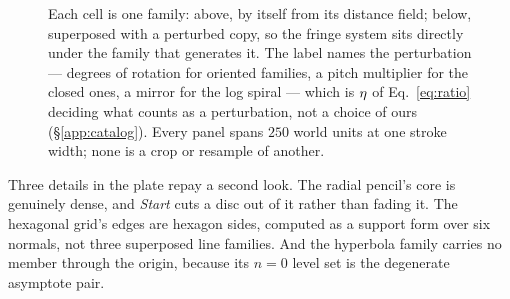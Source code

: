 \begin{figure}[p]
  \centering

  \vskip 7pt

  \vskip 7pt

  \vskip 4pt
  \caption{ Each cell is one
  family: above, by itself from its distance field; below, superposed with a
  perturbed copy, so the fringe system sits directly under the family that
  generates it. The label names the perturbation --- degrees of rotation for
  oriented families, a pitch multiplier for the closed ones, a mirror for the
  log spiral --- which is $\eta$ of Eq.~\ref{eq:ratio} deciding what counts as
  a perturbation, not a choice of ours (\S\ref{app:catalog}). Every panel
  spans $250$ world units at one stroke width; none is a crop or resample of
  another.}
  \label{fig:plate}
\end{figure}

Three details in the plate repay a second look. The radial pencil's core is
genuinely dense, and \emph{Start} cuts a disc out of it rather than fading it.
The hexagonal grid's edges are hexagon sides, computed as a support form over
six normals, not three superposed line families. And the hyperbola family
carries no member through the origin, because its $n=0$ level set is the
degenerate asymptote pair.

